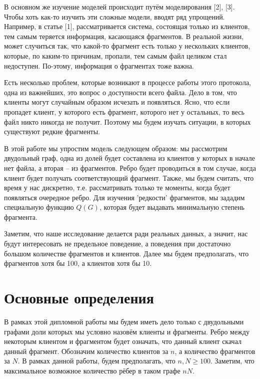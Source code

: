 \documentclass{matmex-diploma-custom}
\newcommand{\geqs}{\geqslant}
\theoremstyle{named}
\begin{document}
В основном же изучение моделей происходит путём моделирования [2], [3].
Чтобы хоть как-то изучить эти сложные модели, вводят ряд упрощений.
Например, в статье [1], рассматривается система, состоящая только из клиентов, тем самым теряется информация, касающаяся фрагментов.
В реальной жизни, может случиться так, что какой-то фрагмент есть только у нескольких клиентов, которые, 
по каким-то причинам, пропали, тем самым файл целиком стал недоступен.
По-этому, информация о фрагментах тоже важна. 


Есть несколько проблем, которые возникают в процессе работы этого протокола, одна из важнейших, это вопрос о доступности всего файла.
Дело в том, что клиенты могут случайным образом исчезать и появляться. 
Ясно, что если пропадет клиент, у которого есть фрагмент, которого нет у остальных, то весь файл никто никогда не получит.
Поэтому мы будем изучать ситуации, в которых существуют редкие фрагменты.


В этой работе мы упростим модель следующем образом: мы рассмотрим двудольный граф, 
одна из долей будет составлена из клиентов у которых в начале нет файла,
а вторая -- из фрагментов. Ребро будет проводиться в том случае, когда клиент будет получать соответствующий фрагмент.
Также, мы будем считать, что время у нас дискретно, т.е. рассматривать только те моменты, когда будет появляться очередное ребро.
Для изучения 'редкости' фрагментов, мы зададим специальную функцию $Q(G)$, которая будет выдавать минимальную степень фрагмента.

Заметим, что наше исследование делается ради реальных данных, а значит, нас будут интересовать не предельное поведение, 
а поведения при достаточно большом количестве фрагментов и клиентов. Далее мы будем предполагать, что фрагментов хотя бы 100, 
а клиентов хотя бы 10.









\section*{Основные определения}
В рамках этой дипломной работы мы будем иметь дело только с двудольными графами доли которых мы условно назовём клиенты и фрагменты.
Ребро между некоторым клиентом и фрагментом будет означать, что данный клиент скачал данный фрагмент.
Обозначим количество клиентов за $n$, а количество фрагментов за $N$. В рамках данной работы, будем предполагать, что $n, N \geqs 100$.
Заметим, что максимальное возможное количество рёбер в таком графе $nN$.
\end{document}
